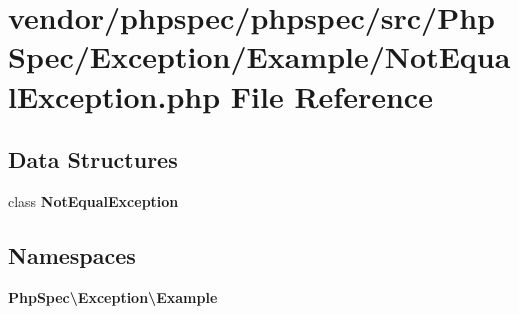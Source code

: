 \section{vendor/phpspec/phpspec/src/\+Php\+Spec/\+Exception/\+Example/\+Not\+Equal\+Exception.php File Reference}
\label{_not_equal_exception_8php}
\subsection*{Data Structures}
\begin{DoxyCompactItemize}
\item 
class {\bf Not\+Equal\+Exception}
\end{DoxyCompactItemize}
\subsection*{Namespaces}
\begin{DoxyCompactItemize}
\item 
 {\bf Php\+Spec\textbackslash{}\+Exception\textbackslash{}\+Example}
\end{DoxyCompactItemize}
